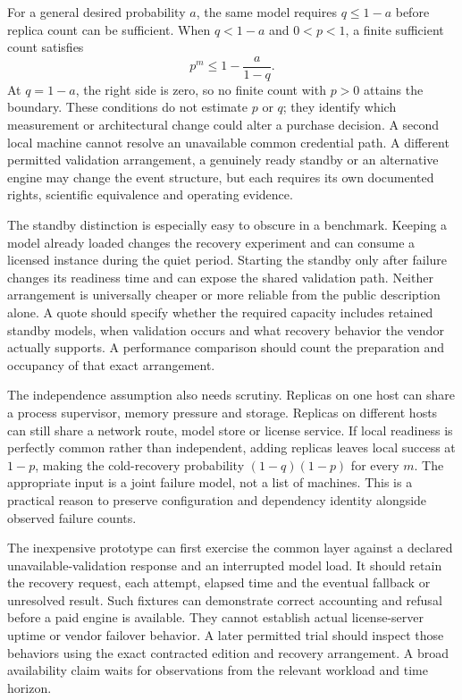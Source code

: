 For a general desired probability $a$, the same model requires
$q\leq1-a$ before replica count can be sufficient. When $q<1-a$ and
$0<p<1$, a finite sufficient count satisfies
\begin{equation}
 p^m\leq1-\frac{a}{1-q}.
 \label{exec17:s8-recovery-condition}
\end{equation}
At $q=1-a$, the right side is zero, so no finite count with $p>0$ attains
the boundary. These conditions do not estimate $p$ or $q$; they identify which
measurement or architectural change could alter a purchase decision. A second
local machine cannot resolve an unavailable common credential path. A different
permitted validation arrangement, a genuinely ready standby or an alternative
engine may change the event structure, but each requires its own documented
rights, scientific equivalence and operating evidence.

The standby distinction is especially easy to obscure in a benchmark.
Keeping a model already loaded changes the recovery experiment and can consume
a licensed instance during the quiet period. Starting the standby only after
failure changes its readiness time and can expose the shared validation path.
Neither arrangement is universally cheaper or more reliable from the public
description alone. A quote should specify whether the required capacity
includes retained standby models, when validation occurs and what recovery
behavior the vendor actually supports. A performance comparison should count
the preparation and occupancy of that exact arrangement.

The independence assumption also needs scrutiny. Replicas on one host can
share a process supervisor, memory pressure and storage. Replicas on different
hosts can still share a network route, model store or license service. If local
readiness is perfectly common rather than independent, adding replicas leaves
local success at $1-p$, making the cold-recovery probability $(1-q)(1-p)$
for every $m$. The appropriate input is a joint failure model, not a list of
machines. This is a practical reason to preserve configuration and dependency
identity alongside observed failure counts.

The inexpensive prototype can first exercise the common layer against a
declared unavailable-validation response and an interrupted model load. It
should retain the recovery request, each attempt, elapsed time and the eventual
fallback or unresolved result. Such fixtures can demonstrate correct accounting
and refusal before a paid engine is available. They cannot establish actual
license-server uptime or vendor failover behavior. A later permitted trial
should inspect those behaviors using the exact contracted edition and recovery
arrangement. A broad availability claim waits for observations from the relevant
workload and time horizon.

